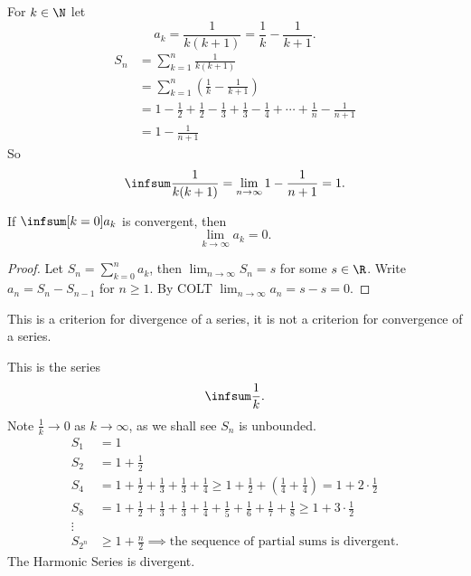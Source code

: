 \documentclass[10pt, a4paper]{article}
\begin{document}
\begin{example}
    For $k \in \N$ let
    \[
    a_k = \frac{1}{k(k + 1)} = \frac{1}{k} - \frac{1}{k + 1}.
    \]
    \begin{align*}
        S_n &= \sum_{k = 1}^{n}\frac{1}{k(k + 1)} \\
        &= \sum_{k = 1}^{n}\left(\frac{1}{k} - \frac{1}{k + 1}\right) \\
        &= 1 - \frac{1}{2} + \frac{1}{2} - \frac{1}{3} + \frac{1}{3} - \frac{1}{4} + \dotsi + \frac{1}{n} - \frac{1}{n + 1} \\
        &= 1 - \frac{1}{n + 1}
    \end{align*}
    So
    \[
    \infsum\frac{1}{k(k + 1)} = \lim_{n \to \infty}1 - \frac{1}{n + 1} = 1.
    \]
\end{example}

\begin{lemma}
    If $\infsum[k = 0]a_k$ is convergent,
    then
    \[
    \lim_{k \to \infty}a_k = 0.
    \]
    \begin{proof}
        Let $S_n = \sum_{k = 0}^{n}a_k$,
        then $\lim_{n \to \infty}S_n = s$ for some $s \in \R$.
        Write $a_n = S_n - S_{n - 1}$ for $n \geq 1$.
        By COLT $\lim_{n \to \infty}a_n = s - s = 0$.
    \end{proof}
\end{lemma}
This is a criterion for divergence of a series,
it is not a criterion for convergence of a series.

\begin{example}
    This is the series
    \[
    \infsum\frac{1}{k}.
    \]
    Note $\frac{1}{k} \to 0$ as $k \to \infty$,
    as we shall see $S_n$ is unbounded.
    \begin{align*}
    S_1 &= 1 \\
    S_2 &= 1 + \frac{1}{2} \\
    S_4 &= 1 + \frac{1}{2} + \frac{1}{3} + \frac{1}{3} + \frac{1}{4} \geq 1 + \frac{1}{2} + \left(\frac{1}{4} + \frac{1}{4}\right) = 1 + 2 \cdot \frac{1}{2} \\
    S_8 &= 1 + \frac{1}{2} + \frac{1}{3} + \frac{1}{3} + \frac{1}{4} + \frac{1}{5} + \frac{1}{6} + \frac{1}{7} + \frac{1}{8} \geq 1 + 3 \cdot \frac{1}{2} \\
    \vdots \\
    S_{2 ^ n} &\geq 1 + \frac{n}{2} \implies \text{the sequence of partial sums is divergent}.
    \end{align*}
    The Harmonic Series is divergent.
\end{example}
\end{document}
